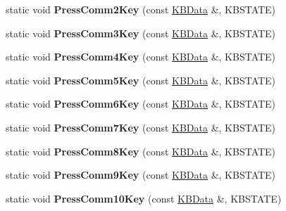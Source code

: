 \begin{DoxyCompactItemize}
\item 
static void {\bfseries Press\+Comm2\+Key} (const \hyperlink{classKBData}{K\+B\+Data} \&, K\+B\+S\+T\+A\+TE)\hypertarget{classFireKeyboard_a22c2b29f0c9c3937db8f1988f6aa5826}{}\label{classFireKeyboard_a22c2b29f0c9c3937db8f1988f6aa5826}

\item 
static void {\bfseries Press\+Comm3\+Key} (const \hyperlink{classKBData}{K\+B\+Data} \&, K\+B\+S\+T\+A\+TE)\hypertarget{classFireKeyboard_a867c2dc15e3318483e5a5a68b1734943}{}\label{classFireKeyboard_a867c2dc15e3318483e5a5a68b1734943}

\item 
static void {\bfseries Press\+Comm4\+Key} (const \hyperlink{classKBData}{K\+B\+Data} \&, K\+B\+S\+T\+A\+TE)\hypertarget{classFireKeyboard_aea5c918fd67b03524164d913fb2b905a}{}\label{classFireKeyboard_aea5c918fd67b03524164d913fb2b905a}

\item 
static void {\bfseries Press\+Comm5\+Key} (const \hyperlink{classKBData}{K\+B\+Data} \&, K\+B\+S\+T\+A\+TE)\hypertarget{classFireKeyboard_a64f864388f3dad2c8442a21ca1974c3e}{}\label{classFireKeyboard_a64f864388f3dad2c8442a21ca1974c3e}

\item 
static void {\bfseries Press\+Comm6\+Key} (const \hyperlink{classKBData}{K\+B\+Data} \&, K\+B\+S\+T\+A\+TE)\hypertarget{classFireKeyboard_a5d62f9ae71e99fa26b02f942f40be31e}{}\label{classFireKeyboard_a5d62f9ae71e99fa26b02f942f40be31e}

\item 
static void {\bfseries Press\+Comm7\+Key} (const \hyperlink{classKBData}{K\+B\+Data} \&, K\+B\+S\+T\+A\+TE)\hypertarget{classFireKeyboard_a3909aa89fe2dad2d358409e8182ecb60}{}\label{classFireKeyboard_a3909aa89fe2dad2d358409e8182ecb60}

\item 
static void {\bfseries Press\+Comm8\+Key} (const \hyperlink{classKBData}{K\+B\+Data} \&, K\+B\+S\+T\+A\+TE)\hypertarget{classFireKeyboard_a68e1f9bd5b09df02ab81970dceaaf7ee}{}\label{classFireKeyboard_a68e1f9bd5b09df02ab81970dceaaf7ee}

\item 
static void {\bfseries Press\+Comm9\+Key} (const \hyperlink{classKBData}{K\+B\+Data} \&, K\+B\+S\+T\+A\+TE)\hypertarget{classFireKeyboard_aebfae0c0375323fad8ebb9da17bdad5c}{}\label{classFireKeyboard_aebfae0c0375323fad8ebb9da17bdad5c}

\item 
static void {\bfseries Press\+Comm10\+Key} (const \hyperlink{classKBData}{K\+B\+Data} \&, K\+B\+S\+T\+A\+TE)\hypertarget{classFireKeyboard_a65d6423662568cf7f5734b51e2053939}{}\label{classFireKeyboard_a65d6423662568cf7f5734b51e2053939}


\end{DoxyCompactItemize}
